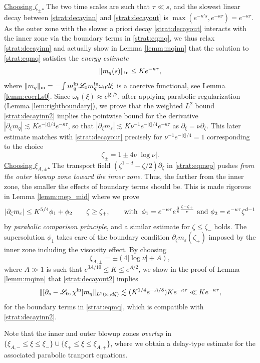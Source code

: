 \documentclass[11pt]{aims}
\theoremstyle{definition}
\newcommand{\ep}{\varepsilon}
\newcommand{\Ls}{\mathscr{L}}
\newcommand{\pa}{\partial}
\newcommand{\inn}{\textup{in}}
\newcommand{\be}{\begin{equation}}
\newcommand{\ee}{\end{equation}}
\numberwithin{equation}{section}
\begin{document}
\underline{Choosing $\zeta_{\pm}$.} The two time scales are such that $\tau\ll s$, and the slowest linear decay between \eqref{strat:decayinn} and \eqref{strat:decayout} is $\max(e^{-\kappa's},e^{-\kappa \tau})=e^{-\kappa \tau}$. As the outer zone with the slower a priori decay \eqref{strat:decayout} interacts with the inner zone via the boundary terms in \eqref{strat:eqmq}, we thus relax \eqref{strat:decayinn} and actually show in Lemma \ref{lemm:mqinn} that the solution to \eqref{strat:eqmq} satisfies the \emph{energy estimate}
\be \label{strat:decayinn2}
\| m_q(s)\|_{\inn}\leq K e^{-\kappa \tau},
\ee
where $\| m_q\|_\inn=-\int m_q^\inn \Ls_0 m_q^\inn \omega_0d\xi$ is a coercive functional, see Lemma \ref{lemm:coerLs0}. Since $\omega_0(\xi) \approx e^{|\xi|/2}$, after applying parabolic regularization (Lemma \ref{lem:rightboundary}), we prove that the weighted $L^2$ bound \eqref{strat:decayinn2} implies the pointwise bound for the derivative $|\pa_\xi m_q |\lesssim K e^{-|\xi|/4}e^{-\kappa \tau}$, so that $|\pa_\zeta m_\varepsilon| \lesssim K\nu^{-1}e^{-|\xi|/4}e^{-\kappa \tau}$ as $\pa_\xi=\nu \pa_\zeta$. This later estimate matches with \eqref{strat:decayout} precisely for $\nu^{-1}e^{-|\xi|/4}=1$ corresponding to the choice
$$
\zeta_{\pm}= 1\pm 4\nu |\log \nu|.
$$
\underline{Choosing $\xi_{A,\pm}$.} The transport field $ \left( \zeta^{1-d} - \zeta/2 \right) \pa_\zeta$ in \eqref{strat:eqmep} pushes \emph{from the outer blowup zone toward the inner zone}. Thus, the farther from the inner zone, the smaller the effects of boundary terms should be. This is made rigorous in Lemma \ref{lemm:mep_mid} where we prove
\be \label{strat:decayout2}
|\pa_\zeta m_\ep | \leq K^{5/4} \phi_1+ \phi_2 \qquad \zeta\geq \zeta_+, \qquad \textup{with}\;\; \phi_1 =  e^{-\kappa \tau}e^{\frac 38 \frac{\zeta-\zeta_+}{\nu}} \mbox{ and } \phi_2=e^{-\kappa \tau}\zeta^{d-1}
\ee
by \emph{parabolic comparison principle}, and a similar estimate for $\zeta\leq \zeta_-$ holds. The supersolution $\phi_1$ takes care of the boundary condition $\pa_\zeta m_\ep (\zeta_+)$ imposed by the inner zone including the viscosity effect. By choosing
$$
\xi_{A,\pm}= \pm (4|\log \nu|+A),
$$
where $A\gg 1 $ is such that $e^{3A/10}\leq K\leq e^{A/2}$, we show in the proof of Lemma \ref{lemm:mqinn} that \eqref{strat:decayout2} implies
$$
\| [\pa_s -\Ls_0,\chi^\inn]m_q\|_{L^2(\omega_0d\xi)}\lesssim (K^{1/4}e^{-A/8}) K e^{-\kappa \tau}\ll K e^{-\kappa \tau},
$$
for the boundary terms in \eqref{strat:eqmq}, which is compatible with \eqref{strat:decayinn2}.

Note that the inner and outer blowup zones \emph{overlap} in $\{\xi_{A,-}\leq \xi \leq \xi_-\}\cup \{\xi_{+}\leq \xi \leq \xi_{A,+}\}$, where we obtain a delay-type estimate for the associated parabolic tranport equations.
\end{document}
